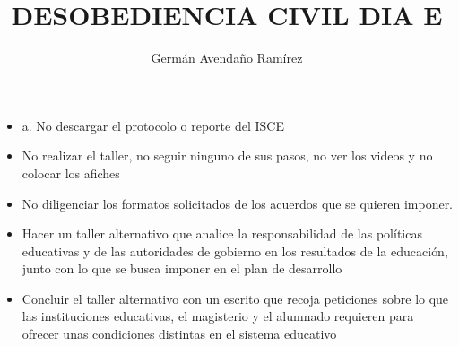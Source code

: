 \documentclass[10pt,letterpaper]{article}
\author{Germán Avendaño Ramírez}
\title{DESOBEDIENCIA CIVIL DIA E}
\begin{document}
\maketitle
\begin{itemize}
\item a. No descargar el protocolo o reporte del ISCE
\item No realizar el taller, no seguir ninguno de sus pasos, no ver los videos y no colocar los afiches
\item No diligenciar los formatos solicitados de los acuerdos que se quieren imponer.
\item Hacer un taller alternativo que analice la responsabilidad de las políticas educativas y de las autoridades de gobierno en los resultados de la educación, junto con lo que se busca imponer en el plan de desarrollo
\item Concluir el taller alternativo con un escrito que recoja peticiones sobre lo que las instituciones educativas, el magisterio y el alumnado requieren para ofrecer unas condiciones distintas en el sistema educativo
\end{itemize}
\end{document}
